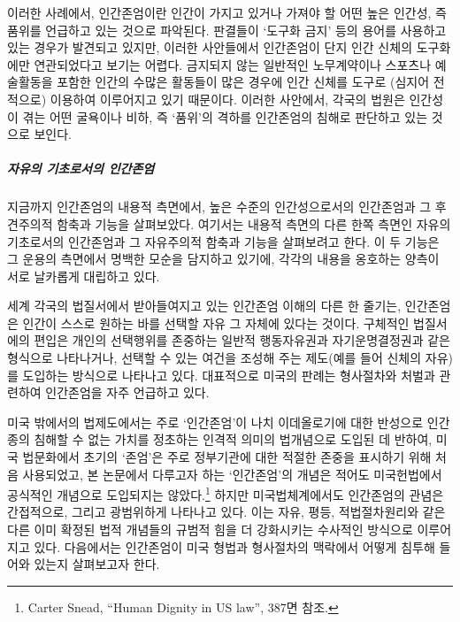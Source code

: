 이러한 사례에서, 인간존엄이란 인간이 가지고 있거나 가져야 할 어떤 높은 인간성, 즉 품위를 언급하고 있는 것으로 파악된다. 판결들이 `도구화 금지' 등의 용어를 사용하고 있는 경우가 발견되고 있지만, 이러한 사안들에서 인간존엄이 단지 인간 신체의 도구화에만 연관되었다고 보기는 어렵다. 금지되지 않는 일반적인 노무계약이나 스포츠나 예술활동을 포함한 인간의 수많은 활동들이 많은 경우에 인간 신체를 도구로 (심지어 전적으로) 이용하여 이루어지고 있기 때문이다. 이러한 사안에서, 각국의 법원은 인간성이 겪는 어떤 굴욕이나 비하, 즉 `품위'의 격하를 인간존엄의 침해로 판단하고 있는 것으로 보인다.

\subparagraph{자유의 기초로서의 인간존엄}

지금까지 인간존엄의 내용적 측면에서, 높은 수준의 인간성으로서의 인간존엄과 그 후견주의적 함축과 기능을 살펴보았다. 여기서는 내용적 측면의 다른 한쪽 측면인 자유의 기초로서의 인간존엄과 그 자유주의적 함축과 기능을 살펴보려고 한다. 이 두 기능은 그 운용의 측면에서 명백한 모순을 담지하고 있기에, 각각의 내용을 옹호하는 양측이 서로 날카롭게 대립하고 있다.

세계 각국의 법질서에서 받아들여지고 있는 인간존엄 이해의 다른 한 줄기는, 인간존엄은 인간이 스스로 원하는 바를 선택할 자유 그 자체에 있다는 것이다. 구체적인 법질서에의 편입은 개인의 선택행위를 존중하는 일반적 행동자유권과 자기운명결정권과 같은 형식으로 나타나거나, 선택할 수 있는 여건을 조성해 주는 제도(예를 들어 신체의 자유)를 도입하는 방식으로 나타나고 있다. 대표적으로 미국의 판례는 형사절차와 처벌과 관련하여 인간존엄을 자주 언급하고 있다.

미국 밖에서의 법제도에서는 주로 `인간존엄'이 나치 이데올로기에 대한 반성으로 인간종의 침해할 수 없는 가치를 정초하는 인격적 의미의 법개념으로 도입된 데 반하여, 미국 법문화에서 초기의 `존엄'은 주로 정부기관에 대한 적절한 존중을 표시하기 위해 처음 사용되었고, 본 논문에서 다루고자 하는 `인간존엄'의 개념은 적어도 미국헌법에서 공식적인 개념으로 도입되지는 않았다.\footnote{Carter Snead, ``Human Dignity in US law'', 387면 참조.} 하지만 미국법체계에서도 인간존엄의 관념은 간접적으로, 그리고 광범위하게 나타나고 있다. 이는 자유, 평등, 적법절차원리와 같은 다른 이미 확정된 법적 개념들의 규범적 힘을 더 강화시키는 수사적인 방식으로 이루어지고 있다. 다음에서는 인간존엄이 미국 형법과 형사절차의 맥락에서 어떻게 침투해 들어와 있는지 살펴보고자 한다.

